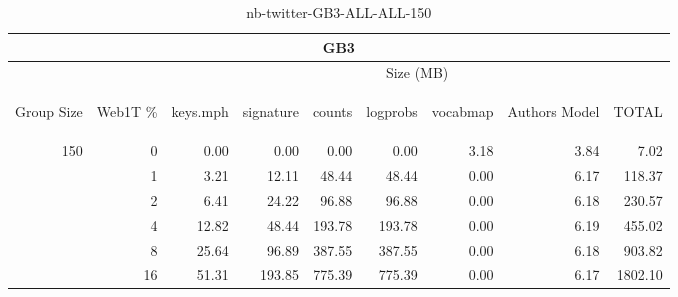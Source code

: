 \begin{center}
\begin{table}[htbp] 
 \begin{center}
\begin{tabular}{ | r | r | r | r | r | r | r | r | r |}
\hline
\multicolumn{9}{|c|}{GB3}\\
\hline
 & & \multicolumn{7}{|c|}{Size (MB)}\\ \cline{3-9}
\begin{sideways}Group Size\end{sideways} & \begin{sideways}Web1T \% \end{sideways} & \begin{sideways}keys.mph\end{sideways} & \begin{sideways}signature\end{sideways} & \begin{sideways}counts\end{sideways} & \begin{sideways}logprobs\end{sideways} & \begin{sideways}vocabmap\end{sideways} & \begin{sideways}Authors Model \end{sideways} & \begin{sideways}TOTAL\end{sideways}\\
\hline
\multirow{5}{*}{150}
 & 0 & 0.00 & 0.00 & 0.00 & 0.00 & 3.18 & 3.84 & 7.02\\ \cline{2-9}
 & 1 & 3.21 & 12.11 & 48.44 & 48.44 & 0.00 & 6.17 & 118.37\\ \cline{2-9}
 & 2 & 6.41 & 24.22 & 96.88 & 96.88 & 0.00 & 6.18 & 230.57\\ \cline{2-9}
 & 4 & 12.82 & 48.44 & 193.78 & 193.78 & 0.00 & 6.19 & 455.02\\ \cline{2-9}
 & 8 & 25.64 & 96.89 & 387.55 & 387.55 & 0.00 & 6.18 & 903.82\\ \cline{2-9}
 & 16 & 51.31 & 193.85 & 775.39 & 775.39 & 0.00 & 6.17 & 1802.10\\ \cline{2-9}
\hline
\end{tabular}
\caption{nb-twitter-GB3-ALL-ALL-150}
\label{table:nb-twitter-GB3-ALL-ALL-150}
\end{center}
 \end{table}
\end{center}


